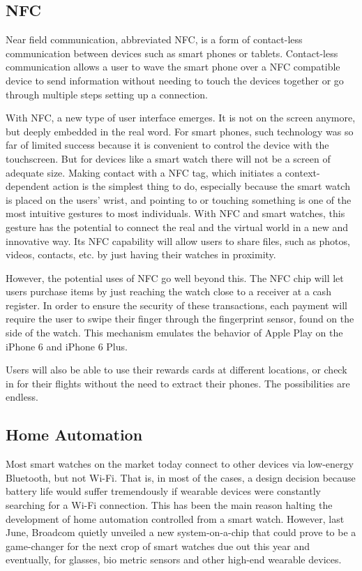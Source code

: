 \documentclass{article}
\begin{document}
\subsection{NFC}
Near field communication, abbreviated NFC, is a form of contact-less communication between devices such as smart phones or tablets. Contact-less communication allows a user to wave the smart phone over a NFC compatible device to send information without needing to touch the devices together or go through multiple steps setting up a connection.

With NFC, a new type of user interface emerges. It is not on the screen anymore, but deeply embedded in the real word. For smart phones, such technology was so far of limited success because it is convenient to control the device with the touchscreen. But for devices like a smart watch there will not be a screen of adequate size. Making contact with a NFC tag, which initiates a context-dependent action is the simplest thing to do, especially because the smart watch is placed on the users' wrist, and pointing to or touching something is one of the most intuitive gestures to most individuals. With NFC and smart watches, this gesture has the potential to connect the real and the virtual world in a new and innovative way. Its NFC capability will allow users to share files, such as photos, videos, contacts, etc. by just having their watches in proximity. 

However, the potential uses of NFC go well beyond this. The NFC chip will let users purchase items by just reaching the watch close to a receiver at a cash register. In order to ensure the security of these transactions, each payment will require the user to swipe their finger through the fingerprint sensor, found on the side of the watch. This mechanism emulates the behavior of Apple Play on the iPhone 6 and iPhone 6 Plus. 

Users will also be able to use their rewards cards at different locations, or check in for their flights without the need to extract their phones. The possibilities are endless.




\subsection{Home Automation}
Most smart watches on the market today connect to other devices via low-energy Bluetooth, but not Wi-Fi. That is, in most of the cases, a design decision because battery life would suffer tremendously if wearable devices were constantly searching for a Wi-Fi connection. This has been the main reason halting the development of home automation controlled from a smart watch. However, last June, Broadcom quietly unveiled a new system-on-a-chip that could prove to be a game-changer for the next crop of smart watches due out this year and eventually, for glasses, bio metric sensors and other high-end wearable devices.
\end{document}
